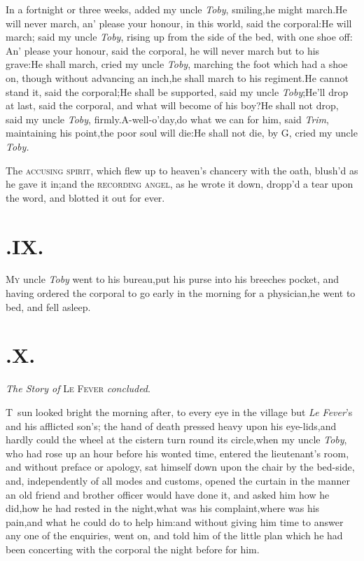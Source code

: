 \documentclass{article}
\begin{document}
\tsh In a fortnight or three weeks, added my uncle
\textit{Toby}, smiling,\tsh he might march.\tsh He
will never march, an’ please your honour, in this world, said
the corporal:\tsh He will march; said my uncle
\textit{Toby}, rising up from the side of the bed, with one shoe
off:\tsh\break
An’ please your honour, said the corporal,
he will never march but to his grave:\tsh He shall march,
cried my uncle \textit{Toby}, marching the foot which had a shoe on,
though without advancing an inch,\tsk he shall march to his
regiment.\tsh He cannot stand it, said the
corporal;\tsh He shall be supported, said my uncle
\textit{Toby};\tsh He’ll drop at last, said the
corporal, and what will become of his boy?\tsh He shall
not drop, said my uncle \textit{Toby},
firmly.\tsh A-well-o’day,\break\tsk do what we can for
him, said \textit{Trim}, maintaining his point,\tsk the poor soul
will die:\tsh He shall not die, by G\tsk , cried my
uncle \textit{Toby.}

\tsk The \textsc{accusing spirit}, which flew up to
heaven’s chancery with the oath, blush’d as he gave it
in;\tsk and the \textsc{recording angel}, as he wrote it
down, dropp’d a tear upon the word, and blotted it out for
ever.

\section{.\enspace IX.}

\lettrine{\Tsk M}{y} uncle \textit{Toby}
went to his bureau,\tsk put his purse into his breeches pocket,
and having ordered the corporal to go early in the morning for a
physician,\tsk he went to bed, and fell asleep.

\vfill{}\eject
\null\par
\section{.\enspace X.}

\smallskip
\centerline{\textit{The Story of} \textsc{Le Fever} \textit{concluded}.}

\lettrine{T}{\,} sun looked bright the morning
after, to every eye in the village but \textit{Le Fever}’s and
his afflicted son’s; the hand of death pressed heavy upon his
eye-lids,\tsh and hardly could the wheel at the cistern
turn round its circle,\tsk when my uncle \textit{Toby}, who had
rose up an hour before his wonted time, entered the
lieutenant’s room, and without preface or apology, sat
himself down upon the chair by the bed-side, and, independently of
all modes and customs, opened the curtain in the manner an old
friend and brother officer would have done it, and asked him how he
did,\tsk how he had rested in the night,\tsk what was his
complaint,\tsk where was his pain,\tsk and what he could do to
help him:\tsh and without giving him time to answer any
one of the enquiries, went on, and told him of the little plan
which he had been concerting with the corporal the night
before for him.\tsh
\end{document}
